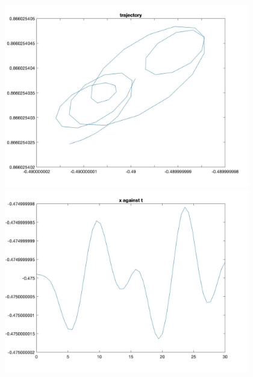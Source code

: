 \documentclass[11pt]{article}
\begin{document}
\begin{figure}[H]
\includegraphics[width = 12cm, height = 8cm]{Q5(3).jpg}
\includegraphics[width = 12cm, height = 8cm]{Q5(4).jpg}
\end{figure}
\end{document}
